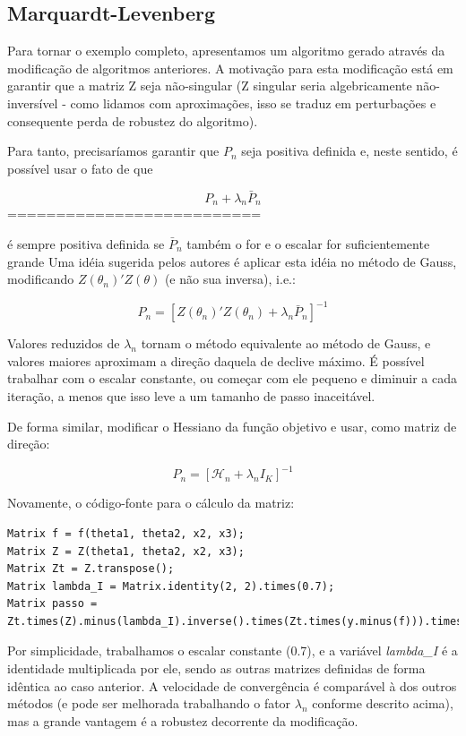 \documentclass{abnt}
\newenvironment{mylisting}
{\begin{list}{}{\setlength{\leftmargin}{1em}}\item\scriptsize\bfseries}
{\end{list}}
\begin{document}
\subsection{Marquardt-Levenberg}

Para tornar o exemplo completo, apresentamos um algoritmo gerado através da modificação de algoritmos anteriores. A motivação para esta modificação está em garantir que a matriz Z seja não-singular (Z singular seria algebricamente não-inversível - como lidamos com aproximações, isso se traduz em perturbações e consequente perda de robustez do algoritmo).

Para tanto, precisaríamos garantir que $P_n$ seja positiva definida e, neste sentido, é possível usar o fato de que

\[  P_n + \lambda_n\bar P_n \]
==========================

é sempre positiva definida se $\bar P_n$ também o for e o escalar for suficientemente grande Uma idéia sugerida pelos autores é aplicar esta idéia no método de Gauss, modificando $Z(\theta_n)'Z(\theta)$ (e não sua inversa), i.e.:

\[ P_n = [Z(\theta_n)'Z(\theta_n) + \lambda_n\bar P_n]^{-1} \]

	Valores reduzidos de $\lambda_n$ tornam o método equivalente ao método de Gauss, e valores maiores aproximam a direção daquela de declive máximo. É possível trabalhar com o escalar constante, ou começar com ele pequeno e diminuir a cada iteração, a menos que isso leve a um tamanho de passo inaceitável.

De forma similar, modificar o Hessiano da função objetivo e usar, como matriz de direção:

\[ P_n = [\mathcal{H}_n+\lambda_nI_K]^{-1} \]

Novamente, o código-fonte para o cálculo da matriz:

\begin{mylisting}
\begin{verbatim}
Matrix f = f(theta1, theta2, x2, x3); 
Matrix Z = Z(theta1, theta2, x2, x3); 
Matrix Zt = Z.transpose(); 
Matrix lambda_I = Matrix.identity(2, 2).times(0.7); 
Matrix passo = Zt.times(Z).minus(lambda_I).inverse().times(Zt.times(y.minus(f))).times(-1);
\end{verbatim}
\end{mylisting}

Por simplicidade, trabalhamos o escalar constante (0.7), e a variável \textit{lambda\_I} é a identidade multiplicada por ele, sendo as outras matrizes definidas de forma idêntica ao caso anterior. A velocidade de convergência é comparável à dos outros métodos (e pode ser melhorada trabalhando o fator $\lambda_n$ conforme descrito acima), mas a grande vantagem é a robustez decorrente da modificação.
\end{document}
